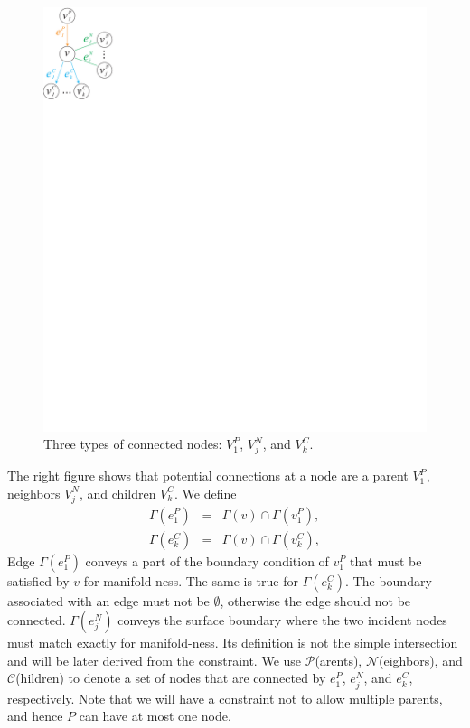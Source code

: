 \begin{figure}
  \includegraphics[width=0.34\columnwidth]{../figures/graph_proof.pdf}
 \caption{Three types of connected nodes: $V^P_1$, $V^N_j$,
 and $V^C_k$.}
\end{figure}
The right figure shows that potential connections at a node are a parent
$V^P_1$, neighbors $V^N_j$, and children $V^C_k$.
We define
\begin{eqnarray*}
\Gamma(e^P_1) &=& \Gamma(v)\cap \Gamma(v^P_1), \nonumber\\
\Gamma(e^C_k) &=& \Gamma(v)\cap \Gamma(v^C_k), \nonumber
\end{eqnarray*}
Edge $\Gamma(e^P_1)$ conveys a part of the boundary condition of $v^P_1$
that must be satisfied by $v$ for manifold-ness. The same is true for
$\Gamma(e^C_k)$.  The boundary associated with an edge must not be
$\emptyset$, otherwise the edge should not be connected. $\Gamma(e^N_j)$
conveys the surface boundary where the two incident nodes must match
exactly for manifold-ness. Its definition is not the simple intersection
and will be later derived from the constraint.
%
We use $\mathcal{P}$(arents), $\mathcal{N}$(eighbors), and
$\mathcal{C}$(hildren) to denote a set of nodes that are connected by
$e^P_1$, $e^N_j$, and $e^C_k$, respectively. Note that we will have a
constraint not to allow multiple parents, and hence $P$ can have at most
one node.
%
%

